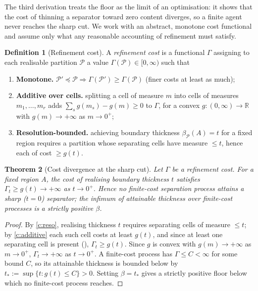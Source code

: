 \documentclass[11pt,a4paper]{article}
\theoremstyle{thmstyle}
\newtheorem{theorem}{Theorem}[section]
\theoremstyle{definition}
\newtheorem{definition}[theorem]{Definition}
\theoremstyle{remark}
\newcommand{\R}{\mathbb{R}}
\newcommand{\thick}{\beta}
\newcommand{\Part}{\mathscr{P}}
\begin{document}
The third derivation treats the floor as the limit of an optimisation: it shows
that the cost of thinning a separator toward zero content diverges, so a finite
agent never reaches the sharp cut. We work with an abstract, monotone cost
functional and assume only what any reasonable accounting of refinement must
satisfy.

\begin{definition}[Refinement cost]
\label{def:cost}
A \emph{refinement cost} is a functional $\Gamma$ assigning to each realisable
partition $\Part$ a value $\Gamma(\Part)\in[0,\infty)$ such that
\begin{enumerate}[label=\textup{(C\arabic*)},leftmargin=3em]
\item\label{c:mono} \textbf{Monotone.} $\Part'\preceq\Part\Rightarrow
\Gamma(\Part')\ge\Gamma(\Part)$ \textup{(}finer costs at least as much\textup{)};
\item\label{c:additive} \textbf{Additive over cells.} splitting a cell of
measure $m$ into cells of measures $m_1,\dots,m_r$ adds
$\sum_s g(m_s)-g(m)\ge0$ to $\Gamma$, for a convex $g\colon(0,\infty)\to\R$
with $g(m)\to+\infty$ as $m\to0^+$;
\item\label{c:reso} \textbf{Resolution-bounded.} achieving boundary thickness
$\thick_\Part(A)=t$ for a fixed region requires a partition whose separating
cells have measure $\le t$, hence each of cost $\ge g(t)$.
\end{enumerate}
\end{definition}

\begin{theorem}[Cost divergence at the sharp cut]
\label{thm:cost}
Let $\Gamma$ be a refinement cost. For a fixed region $A$, the cost of realising
boundary thickness $t$ satisfies $\Gamma_t\ge g(t)\to+\infty$ as $t\to0^+$.
Hence no finite-cost separation process attains a sharp ($t=0$) separator; the
infimum of attainable thickness over finite-cost processes is a strictly
positive $\thick$.
\end{theorem}

\begin{proof}
By \ref{c:reso}, realising thickness $t$ requires separating cells of measure
$\le t$; by \ref{c:additive} each such cell costs at least $g(t)$, and since at
least one separating cell is present (),
$\Gamma_t\ge g(t)$. Since $g$ is convex with $g(m)\to+\infty$ as $m\to0^+$,
$\Gamma_t\to+\infty$ as $t\to0^+$. A finite-cost process has $\Gamma\le C<\infty$
for some bound $C$, so its attainable thickness is bounded below by
$t_\ast:=\sup\{t:g(t)\le C\}>0$. Setting $\thick=t_\ast$ gives a strictly
positive floor below which no finite-cost process reaches.
\end{proof}
\end{document}
